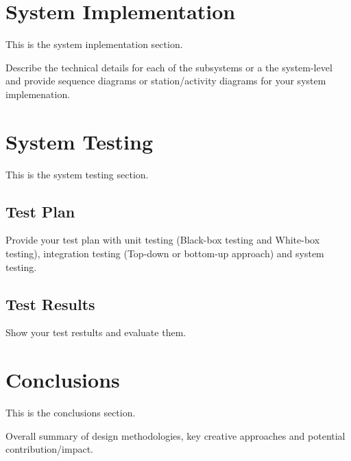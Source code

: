 \documentclass{article}
\begin{document}
\section{System Implementation}
This is the system inplementation section.

Describe the technical details for each of the subsystems or a the system-level and
provide sequence diagrams or station/activity diagrams for your system implemenation.



\section{System Testing}
This is the system testing section.

\subsection{Test Plan}
Provide your test plan with unit testing (Black-box testing and White-box testing), integration testing (Top-down or bottom-up approach) and system testing.

\subsection{Test Results}
Show your test restults and evaluate them. 

\section{Conclusions}
This is the conclusions section.

Overall summary of design methodologies, key creative approaches and potential
contribution/impact. \cite{akyildiz2014roadmap}





 
\end{document}
